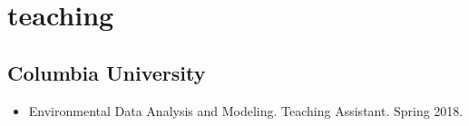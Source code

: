 \documentclass[11pt,article,oneside]{memoir}
\begin{document}
%
%
%
%  
%        
%        


\section{teaching}

\mbox{}\vspace{-\dimexpr\baselineskip\relax}

\vspace{\baselineskip}



\subsection{Columbia University}
\begin{itemize}[label={}]

  \item Environmental Data Analysis and Modeling. Teaching Assistant. Spring 2018.

\end{itemize}


%
%
%
%
%
%  
%        
%
\end{document}
